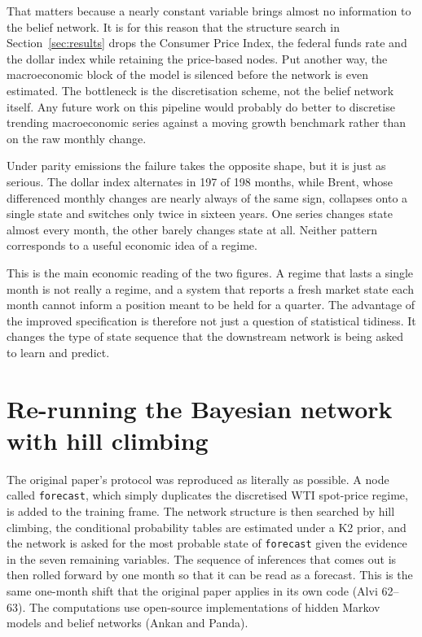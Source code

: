 \documentclass[11pt,a4paper]{article}
\begin{document}
That matters because a nearly constant variable brings almost no information to the belief
network. It is for this reason that the structure search in Section~\ref{sec:results} drops the
Consumer Price Index, the federal funds rate and the dollar index while retaining the price-based
nodes. Put another way, the macroeconomic block of the model is silenced before the network is
even estimated. The bottleneck is the discretisation scheme, not the belief network itself. Any
future work on this pipeline would probably do better to discretise trending macroeconomic series
against a moving growth benchmark rather than on the raw monthly change.

Under parity emissions the failure takes the opposite shape, but it is just as serious. The dollar
index alternates in 197 of 198 months, while Brent, whose differenced monthly changes are
nearly always of the same sign, collapses onto a single state and switches only twice in
sixteen years. One series changes state almost every month, the other barely changes state at
all. Neither pattern corresponds to a useful economic idea of a regime.

This is the main economic reading of the two figures. A regime that lasts a single month is not
really a regime, and a system that reports a fresh market state each month cannot inform a
position meant to be held for a quarter. The advantage of the improved specification is therefore
not just a question of statistical tidiness. It changes the type of state sequence that the
downstream network is being asked to learn and predict.

\section{Re-running the Bayesian network with hill climbing}
\label{sec:replication}

The original paper's protocol was reproduced as literally as possible. A node called
\texttt{forecast}, which simply duplicates the discretised WTI spot-price regime, is added
to the training frame. The network structure is then searched by hill climbing, the conditional
probability tables are estimated under a K2 prior, and the network is asked for the most probable
state of \texttt{forecast} given the evidence in the seven remaining variables. The sequence of
inferences that comes out is then rolled forward by one month so that it can be read as a
forecast. This is the same one-month shift that the original paper applies in its own code (Alvi
62--63). The computations use open-source implementations of hidden Markov models and belief
networks (Ankan and Panda).
\end{document}
